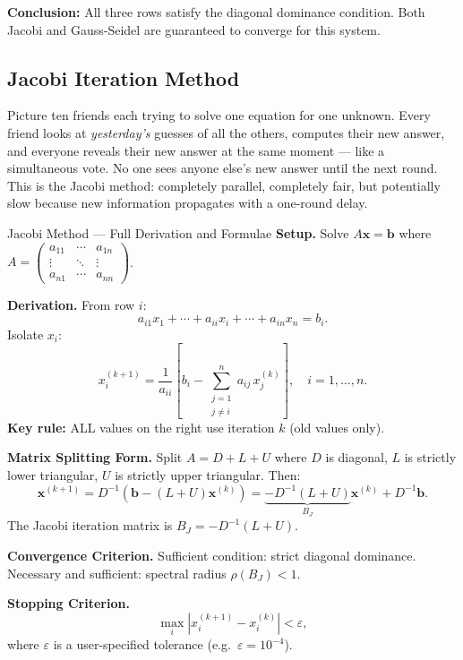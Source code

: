 \documentclass[12pt,a4paper]{article}
\begin{document}
\textbf{Conclusion:} All three rows satisfy the diagonal dominance condition. Both
Jacobi and Gauss-Seidel are guaranteed to converge for this system.

\subsection{Jacobi Iteration Method}

Picture ten friends each trying to solve one equation for one unknown. Every friend
looks at \emph{yesterday's} guesses of all the others, computes their new answer,
and everyone reveals their new answer at the same moment --- like a simultaneous vote.
No one sees anyone else's new answer until the next round. This is the Jacobi method:
completely parallel, completely fair, but potentially slow because new information
propagates with a one-round delay.

\begin{infobox}{Jacobi Method --- Full Derivation and Formulae}
\textbf{Setup.} Solve \(A\mathbf{x} = \mathbf{b}\) where
\(A = \begin{pmatrix} a_{11} & \cdots & a_{1n} \\ \vdots & \ddots & \vdots \\
a_{n1} & \cdots & a_{nn}\end{pmatrix}\).

\textbf{Derivation.} From row \(i\):
\[
  a_{i1}x_1 + \cdots + a_{ii}x_i + \cdots + a_{in}x_n = b_i.
\]
Isolate \(x_i\):
\[
  x_i^{(k+1)} = \frac{1}{a_{ii}}\!\left[b_i - \sum_{\substack{j=1\\j\neq i}}^{n} a_{ij}\,x_j^{(k)}\right], \quad i = 1,\ldots,n.
\]
\textbf{Key rule:} ALL values on the right use iteration \(k\) (old values only).

\textbf{Matrix Splitting Form.} Split \(A = D + L + U\) where \(D\) is diagonal,
\(L\) is strictly lower triangular, \(U\) is strictly upper triangular. Then:
\[
  \mathbf{x}^{(k+1)} = D^{-1}\!\left(\mathbf{b} - (L+U)\mathbf{x}^{(k)}\right)
                       = \underbrace{-D^{-1}(L+U)}_{B_J}\mathbf{x}^{(k)} + D^{-1}\mathbf{b}.
\]
The Jacobi iteration matrix is \(B_J = -D^{-1}(L+U)\).

\textbf{Convergence Criterion.} Sufficient condition: strict diagonal dominance.
Necessary and sufficient: spectral radius \(\rho(B_J) < 1\).

\textbf{Stopping Criterion.}
\[
  \max_{i}\left|x_i^{(k+1)} - x_i^{(k)}\right| < \varepsilon,
\]
where \(\varepsilon\) is a user-specified tolerance (e.g.\ \(\varepsilon = 10^{-4}\)).
\end{infobox}
\end{document}
